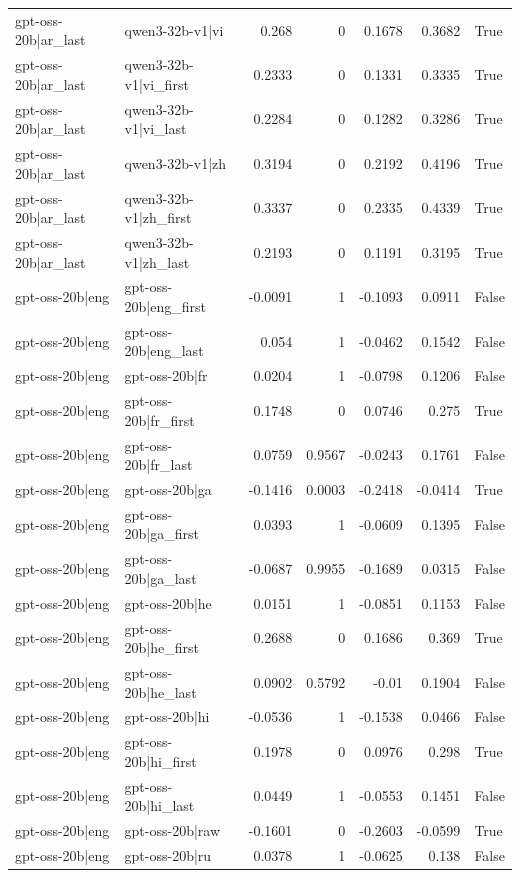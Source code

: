 \begin{table}
\begin{tabular}{l l r r r r l}
gpt-oss-20b|ar_last & qwen3-32b-v1|vi & 0.268 & 0 & 0.1678 & 0.3682 & True \\
gpt-oss-20b|ar_last & qwen3-32b-v1|vi_first & 0.2333 & 0 & 0.1331 & 0.3335 & True \\
gpt-oss-20b|ar_last & qwen3-32b-v1|vi_last & 0.2284 & 0 & 0.1282 & 0.3286 & True \\
gpt-oss-20b|ar_last & qwen3-32b-v1|zh & 0.3194 & 0 & 0.2192 & 0.4196 & True \\
gpt-oss-20b|ar_last & qwen3-32b-v1|zh_first & 0.3337 & 0 & 0.2335 & 0.4339 & True \\
gpt-oss-20b|ar_last & qwen3-32b-v1|zh_last & 0.2193 & 0 & 0.1191 & 0.3195 & True \\
gpt-oss-20b|eng & gpt-oss-20b|eng_first & -0.0091 & 1 & -0.1093 & 0.0911 & False \\
gpt-oss-20b|eng & gpt-oss-20b|eng_last & 0.054 & 1 & -0.0462 & 0.1542 & False \\
gpt-oss-20b|eng & gpt-oss-20b|fr & 0.0204 & 1 & -0.0798 & 0.1206 & False \\
gpt-oss-20b|eng & gpt-oss-20b|fr_first & 0.1748 & 0 & 0.0746 & 0.275 & True \\
gpt-oss-20b|eng & gpt-oss-20b|fr_last & 0.0759 & 0.9567 & -0.0243 & 0.1761 & False \\
gpt-oss-20b|eng & gpt-oss-20b|ga & -0.1416 & 0.0003 & -0.2418 & -0.0414 & True \\
gpt-oss-20b|eng & gpt-oss-20b|ga_first & 0.0393 & 1 & -0.0609 & 0.1395 & False \\
gpt-oss-20b|eng & gpt-oss-20b|ga_last & -0.0687 & 0.9955 & -0.1689 & 0.0315 & False \\
gpt-oss-20b|eng & gpt-oss-20b|he & 0.0151 & 1 & -0.0851 & 0.1153 & False \\
gpt-oss-20b|eng & gpt-oss-20b|he_first & 0.2688 & 0 & 0.1686 & 0.369 & True \\
gpt-oss-20b|eng & gpt-oss-20b|he_last & 0.0902 & 0.5792 & -0.01 & 0.1904 & False \\
gpt-oss-20b|eng & gpt-oss-20b|hi & -0.0536 & 1 & -0.1538 & 0.0466 & False \\
gpt-oss-20b|eng & gpt-oss-20b|hi_first & 0.1978 & 0 & 0.0976 & 0.298 & True \\
gpt-oss-20b|eng & gpt-oss-20b|hi_last & 0.0449 & 1 & -0.0553 & 0.1451 & False \\
gpt-oss-20b|eng & gpt-oss-20b|raw & -0.1601 & 0 & -0.2603 & -0.0599 & True \\
gpt-oss-20b|eng & gpt-oss-20b|ru & 0.0378 & 1 & -0.0625 & 0.138 & False \\

\end{tabular}
\end{table}
